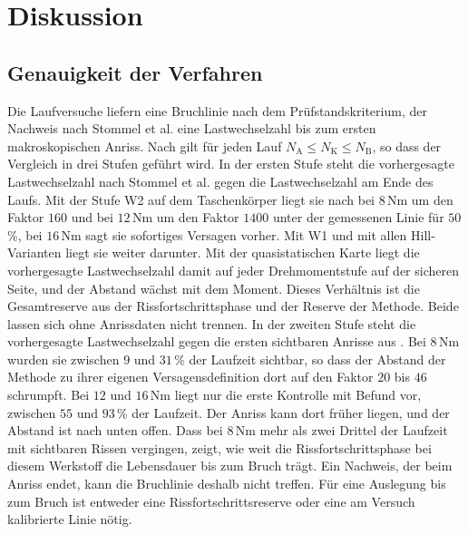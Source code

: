 \chapter{Diskussion}
\label{chap:diskussion}

\section{Genauigkeit der Verfahren}
\label{sec:genauigkeit}

Die Laufversuche liefern eine Bruchlinie nach dem Prüfstandskriterium, der Nachweis nach Stommel et al. eine Lastwechselzahl bis zum ersten makroskopischen Anriss. Nach  gilt für jeden Lauf $N_{\mathrm{A}} \le N_{\mathrm{K}} \le N_{\mathrm{B}}$, so dass der Vergleich in drei Stufen geführt wird. In der ersten Stufe steht die vorhergesagte Lastwechselzahl nach Stommel et al. gegen die Lastwechselzahl am Ende des Laufs. Mit der Stufe W2 auf dem Taschenkörper liegt sie nach  bei $8$\,Nm um den Faktor $160$ und bei $12$\,Nm um den Faktor $1400$ unter der gemessenen Linie für $50$\,\%, bei $16$\,Nm sagt sie sofortiges Versagen vorher. Mit W1 und mit allen Hill-Varianten liegt sie weiter darunter. Mit der quasistatischen Karte liegt die vorhergesagte Lastwechselzahl damit auf jeder Drehmomentstufe auf der sicheren Seite, und der Abstand wächst mit dem Moment. Dieses Verhältnis ist die Gesamtreserve aus der Rissfortschrittsphase und der Reserve der Methode. Beide lassen sich ohne Anrissdaten nicht trennen. In der zweiten Stufe steht die vorhergesagte Lastwechselzahl gegen die ersten sichtbaren Anrisse aus . Bei $8$\,Nm wurden sie zwischen $9$ und $31$\,\% der Laufzeit sichtbar, so dass der Abstand der Methode zu ihrer eigenen Versagensdefinition dort auf den Faktor $20$ bis $46$ schrumpft. Bei $12$ und $16$\,Nm liegt nur die erste Kontrolle mit Befund vor, zwischen $55$ und $93$\,\% der Laufzeit. Der Anriss kann dort früher liegen, und der Abstand ist nach unten offen. Dass bei $8$\,Nm mehr als zwei Drittel der Laufzeit mit sichtbaren Rissen vergingen, zeigt, wie weit die Rissfortschrittsphase bei diesem Werkstoff die Lebensdauer bis zum Bruch trägt. Ein Nachweis, der beim Anriss endet, kann die Bruchlinie deshalb nicht treffen. Für eine Auslegung bis zum Bruch ist entweder eine Rissfortschrittsreserve oder eine am Versuch kalibrierte Linie nötig.

